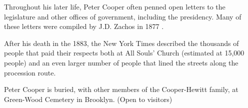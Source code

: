 \documentclass{article}
\begin{document}
\begin{minipage}[t]{0.46\linewidth}
\begin{enumList}
\item Throughout his later life, Peter Cooper often penned open letters to the
legislature and other offices of government, including the presidency. Many of
these letters were compiled by J.D. Zachos in 1877 \cite{opinions}.

\item After his death in the 1883, the New York Times described the {\mdseries
thousands of people that paid their respects} both at All Souls' Church
(estimated at 15,000 people) and an even larger number of people that lined
the streets along the procession route.

\item Peter Cooper is buried, with other members of the Cooper-Hewitt family,
at {\mdseries Green-Wood Cemetery} in Brooklyn. (Open to visitors)

\setcounter{enumTemp}{\value{enumListi}}
\end{enumList}
\end{minipage}\hfill
\end{document}
